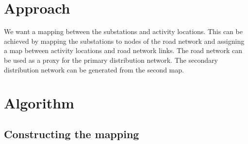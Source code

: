 \documentclass[12pt]{article}
\begin{document}
	\section{Approach}\label{sec:approach}
	We want a mapping between the substations and activity locations. This can be achieved by mapping the substations to nodes of the road network and assigning a map between activity locations and road network links. The road network can be used as a proxy for the primary distribution network. The secondary distribution network can be generated from the second map.
	
	\section{Algorithm}
	\subsection{Constructing the mapping}\label{subsec:map}
\end{document}
